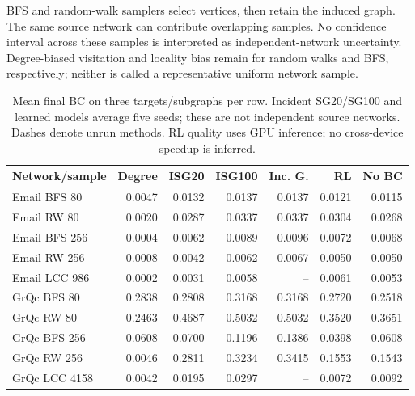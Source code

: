 \documentclass[11pt]{article}
\begin{document}
BFS and random-walk samplers select vertices, then retain the induced graph.
The same source network can contribute overlapping samples. No confidence
interval across these samples is interpreted as independent-network uncertainty.
Degree-biased visitation and locality bias remain for random walks and BFS,
respectively; neither is called a representative uniform network sample.
\begin{table}[H]
\centering
\caption{Mean final BC on three targets/subgraphs per row. Incident SG20/SG100 and learned models average five seeds; these are not independent source networks. Dashes denote unrun methods. RL quality uses GPU inference; no cross-device speedup is inferred.}
\label{tab:real}
\small
\setlength{\tabcolsep}{3pt}
\begin{tabular}{lrrrrrr}
\toprule
Network/sample & Degree & ISG20 & ISG100 & Inc. G. & RL & No BC \\
\midrule
Email BFS 80 & 0.0047 & 0.0132 & 0.0137 & 0.0137 & 0.0121 & 0.0115 \\
Email RW 80 & 0.0020 & 0.0287 & 0.0337 & 0.0337 & 0.0304 & 0.0268 \\
Email BFS 256 & 0.0004 & 0.0062 & 0.0089 & 0.0096 & 0.0072 & 0.0068 \\
Email RW 256 & 0.0008 & 0.0042 & 0.0062 & 0.0067 & 0.0050 & 0.0050 \\
Email LCC 986 & 0.0002 & 0.0031 & 0.0058 & -- & 0.0061 & 0.0053 \\
GrQc BFS 80 & 0.2838 & 0.2808 & 0.3168 & 0.3168 & 0.2720 & 0.2518 \\
GrQc RW 80 & 0.2463 & 0.4687 & 0.5032 & 0.5032 & 0.3520 & 0.3651 \\
GrQc BFS 256 & 0.0608 & 0.0700 & 0.1196 & 0.1386 & 0.0398 & 0.0608 \\
GrQc RW 256 & 0.0046 & 0.2811 & 0.3234 & 0.3415 & 0.1553 & 0.1543 \\
GrQc LCC 4158 & 0.0042 & 0.0195 & 0.0297 & -- & 0.0072 & 0.0092 \\
\bottomrule
\end{tabular}
\end{table}


\end{document}
